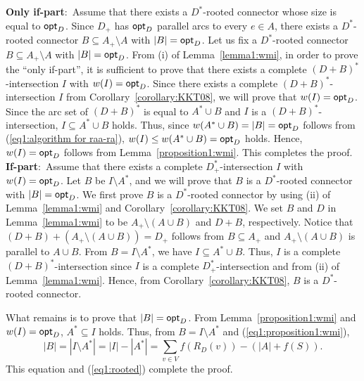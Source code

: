 \documentclass[11pt]{article}
\theoremstyle{plain}
\newcommand{\eop}{\hfill \usebox{\ProofSym}}
\newenvironment{proof2}[1]{\noindent {\it Proof of #1.}}{\eop\par\vspace{0.3cm}}
\begin{document}
\begin{proof2}{Lemma~\ref{lemma2:wmi}}
{\bf Only if-part$\colon$}
Assume that there exists a $D^{\ast}$-rooted connector whose size is equal to ${\sf opt}_D$.
Since $D_+$ has ${\sf opt}_D$ parallel arcs to every $e \in A$, there exists 
a $D^{\ast}$-rooted connector $B\subseteq A_+\setminus A$ with $|B|={\sf opt}_D$. 
Let us fix a $D^{\ast}$-rooted connector $B\subseteq A_+\setminus A$ with $|B|={\sf opt}_D$. 
From (i) of Lemma~\ref{lemma1:wmi}, in order to prove the ``only if-part'', it is sufficient to prove that there exists 
a complete $(D+B)^{\ast}$-intersection $I$ with $w(I)={\sf opt}_D$. 
Since there exists a complete $(D+B)^{\ast}$-intersection $I$ from Corollary~\ref{corollary:KKT08}, 
we will prove that $w(I)={\sf opt}_D$. 
Since the arc set of $(D+B)^{\ast}$ is equal to $A^{\ast}\cup B$ and 
$I$ is a $(D+B)^{\ast}$-intersection, $I \subseteq A^{\ast} \cup B$ holds. 
Thus, since $w(A^{\ast} \cup B)=|B|={\sf opt}_D$ follows from (\ref{eq1:algorithm for raa-ra}), 
$w(I)\le w(A^{\ast} \cup B)={\sf opt}_D$ holds. 
Hence, $w(I)={\sf opt}_D$ follows from Lemma~\ref{proposition1:wmi}. This completes the proof. 
\\
{\bf If-part$\colon$}
Assume that there exists a complete $D_+^{\ast}$-intersection 
$I$ with $w(I)={\sf opt}_D$. 
Let $B$ be $I \setminus A^{\ast}$, and we will 
prove that $B$ is a $D^{\ast}$-rooted connector with 
$|B| = {\sf opt}_D$. 
We first prove $B$ is a $D^{\ast}$-rooted connector by using (ii) of 
Lemma~\ref{lemma1:wmi} and Corollary~\ref{corollary:KKT08}. 
We set $B$ and $D$ in Lemma~\ref{lemma1:wmi} to be 
$A_+\setminus (A\cup B)$ and $D+B$, respectively.
Notice that $(D+B)+(A_+\setminus (A\cup B))=D_+$ follows from $B \subseteq A_+$
and $A_+ \setminus (A\cup B)$ is parallel to $A\cup B$.
From $B=I\setminus A^{\ast}$, we have $I \subseteq A^{\ast}\cup B$. 
Thus, $I$ is a complete $(D+B)^{\ast}$-intersection
since $I$ is a complete $D_+^{\ast}$-intersection and from (ii) 
of Lemma~\ref{lemma1:wmi}.  
Hence, from Corollary~\ref{corollary:KKT08}, 
$B$ is a $D^{\ast}$-rooted connector. 

What remains is to prove that $|B|={\sf opt}_D$. 
From Lemma~\ref{proposition1:wmi} and $w(I)={\sf opt}_D$,
$A^{\ast}\subseteq I$ holds. 
Thus, from $B=I\setminus A^{\ast}$ and (\ref{eq1:proposition1:wmi}), 
\begin{equation*}
|B|=|I\setminus A^{\ast}|= |I| - |A^{\ast}| = \mbox{$\sum$}_{v \in V}f(R_D(v))- (|A|+f(S)).
\end{equation*} 
This equation and (\ref{eq1:rooted}) complete the proof. 
\end{proof2}
\end{document}
